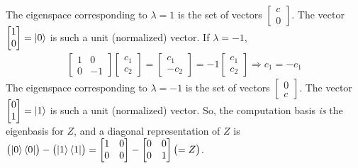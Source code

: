 The eigenspace corresponding to $\lambda = 1$ is the set of vectors $\begin{bmatrix}c \\ 0\end{bmatrix}$.  The vector $\begin{bmatrix} 1 \\ 0\end{bmatrix}=\ket{0}$ is such a unit (normalized) vector. 
If $\lambda = -1$,
\begin{align*}
	\begin{bmatrix}
		1 & 0 \\
		0 & -1
	\end{bmatrix}
	\begin{bmatrix}
		c_1 \\
		c_2
	\end{bmatrix} =
	\begin{bmatrix}
	      c_1 \\
	      -c_2
	\end{bmatrix} =
	 -1
	\begin{bmatrix}
		c_1 \\
		c_2
	\end{bmatrix}
	\Rightarrow c_1 = -c_1
\end{align*}
The eigenspace corresponding to $\lambda = -1$ is the set of vectors $\begin{bmatrix}0 \\ c\end{bmatrix}$.  The vector $\begin{bmatrix} 0 \\ 1\end{bmatrix}=\ket{1}$ is such a unit (normalized) vector.  So, the computation basis \textit{is} the eigenbasis for $Z$, and a diagonal representation of $Z$ is $\bigl(\ket{0}\bra{0}\bigr) - \bigl(\ket{1}\bra{1}\bigr) = \begin{bmatrix}1 & 0 \\ 0 & 0\end{bmatrix} - \begin{bmatrix}0 & 0 \\ 0 & 1\end{bmatrix} \bigl( = Z\bigr)$.


